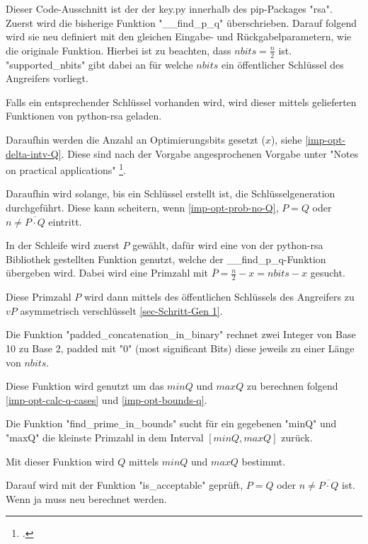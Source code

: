             Dieser Code-Ausschnitt ist der der key.py innerhalb des pip-Packages "rsa".
            Zuerst wird die bisherige Funktion "\_\_find\_p\_q" überschrieben.
            Darauf folgend wird sie neu definiert mit den gleichen Eingabe- und Rückgabelparametern, wie die originale Funktion.
            Hierbei ist zu beachten, dass $nbits = \frac{n}{2}$ ist.
            "supported\_nbits" gibt dabei an für welche $nbits$ ein öffentlicher Schlüssel des Angreifers vorliegt. 
            
            Falls ein entsprechender Schlüssel vorhanden wird, wird dieser mittels gelieferten Funktionen von python-rsa geladen.

            Daraufhin werden die Anzahl an Optimierungsbits gesetzt ($x$), siehe \ref{imp-opt-delta-intv-Q}. Diese sind nach der Vorgabe angesprochenen Vorgabe unter "Notes on practical applications" \footcite[1]{dimgt:rsa}.

            Daraufhin wird solange, bis ein Schlüssel erstellt ist, die Schlüsselgeneration durchgeführt. Diese kann scheitern, wenn \ref{imp-opt-prob-no-Q}, $P = Q$ oder $n \neq \overline{P \cdot Q}$ eintritt.

            In der Schleife wird zuerst $P$ gewählt, dafür wird eine von der python-rsa Bibliothek gestellten Funktion genutzt, welche der \_\_find\_p\_q-Funktion übergeben wird. Dabei wird eine Primzahl mit $\overline{P} = \frac{n}{2} - x = nbits -  x$ gesucht.
            
            Diese Primzahl $P$ wird dann mittels des öffentlichen Schlüssels des Angreifers zu $vP$ asymmetrisch verschlüsselt \ref{sec-Schritt-Gen 1}.

            Die Funktion "padded\_concatenation\_in\_binary" rechnet zwei Integer von Base 10 zu Base 2, padded mit "0" (most significant Bits) diese jeweils zu einer Länge von $nbits$. 

            Diese Funktion wird genutzt um das $minQ$ und $maxQ$ zu berechnen folgend \ref{imp-opt-calc-q-cases} und \ref{imp-opt-bounds-q}.

            Die Funktion "find\_prime\_in\_bounds" sucht für ein gegebenen "minQ" und "maxQ" die kleinste Primzahl in dem Interval $[minQ, maxQ]$ zurück.

            Mit dieser Funktion wird $Q$ mittels $minQ$ und $maxQ$ bestimmt.

            Darauf wird mit der Funktion "is\_acceptable" geprüft, $P = Q$ oder $n \neq \overline{P \cdot Q}$ ist. Wenn ja muss neu berechnet werden.

